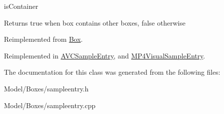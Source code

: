 is\-Container 

\begin{DoxyReturn}{Returns}
true when box contains other boxes, false otherwise 
\end{DoxyReturn}


Reimplemented from \hyperlink{class_box_aa836717b34b2a26f84b6933d143da42b}{Box}.



Reimplemented in \hyperlink{class_a_v_c_sample_entry_ae0627e8954e878a70c9a67e337fd5d26}{A\-V\-C\-Sample\-Entry}, and \hyperlink{class_m_p4_visual_sample_entry_aa683a32a4491a554bfc03b0fe1197bfc}{M\-P4\-Visual\-Sample\-Entry}.



The documentation for this class was generated from the following files\-:\begin{DoxyCompactItemize}
\item 
Model/\-Boxes/sampleentry.\-h\item 
Model/\-Boxes/sampleentry.\-cpp\end{DoxyCompactItemize}
